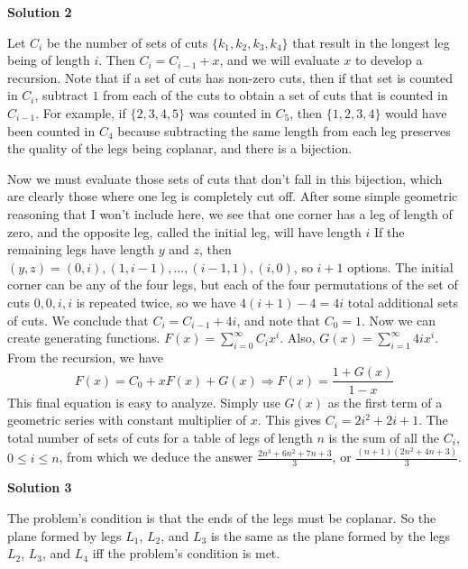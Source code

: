 \begin{enumerate}
 


 



\textbf{Solution 2}

Let $C_i$ be the number of sets of cuts $\{k_1,k_2,k_3,k_4\}$ that result in the longest leg being of length $i$.  Then $C_i=C_{i-1}+x$, and we will evaluate $x$ to develop a recursion.  Note that if a set of cuts has non-zero cuts, then if that set is counted in $C_i$, subtract $1$ from each of the cuts to obtain a set of cuts that is counted in $C_{i-1}$.  For example, if $\{2,3,4,5\}$ was counted in $C_5$, then $\{1,2,3,4\}$ would have been counted in $C_4$ because subtracting the same length from each leg preserves the quality of the legs being coplanar, and there is a bijection.

 Now we must evaluate those sets of cuts that don't fall in this bijection, which are clearly those where one leg is completely cut off.  After some simple geometric reasoning that I won't include here, we see that one corner has a leg of length of zero, and the opposite leg, called the initial leg, will have length $i$  If the remaining legs have length $y$ and $z$, then $(y,z)=(0,i),(1,i-1),...,(i-1,1),(i,0)$, so $i+1$ options.  The initial corner can be any of the four legs, but each of the four permutations of the set of cuts ${0,0,i,i}$ is repeated twice, so we have $4(i+1)-4=4i$ total additional sets of cuts.  We conclude that $C_i=C_{i-1}+4i$, and note that $C_0=1$.  Now we can create generating functions.  $F(x)=\sum_{i=0}^\infty C_ix^i$.  Also, $G(x)=\sum_{i=1}^\infty 4ix^i$. From the recursion, we have
 \[F(x)=C_0+xF(x)+G(x)\Longrightarrow F(x)=\frac{1+G(x)}{1-x}\]This final equation is easy to analyze.  Simply use $G(x)$ as the first term of a geometric series with constant multiplier of $x$.  This gives $C_i=2i^2+2i+1$.  The total number of sets of cuts for a table of legs of length $n$ is the sum of all the $C_i$, $0\le i\le n$, from which we deduce the answer $\frac{2n^3 + 6n^2 +7n + 3}{3}$, or $\frac{(n+1)(2n^2 + 4n +3)}{3}$.

 


 



\textbf{Solution 3}

The problem's condition is that the ends of the legs must be coplanar. So the plane formed by legs $L_1$, $L_2$, and $L_3$ is the same as the plane formed by the legs $L_2$, $L_3$, and $L_4$ iff the problem's condition is met.


\end{enumerate}

